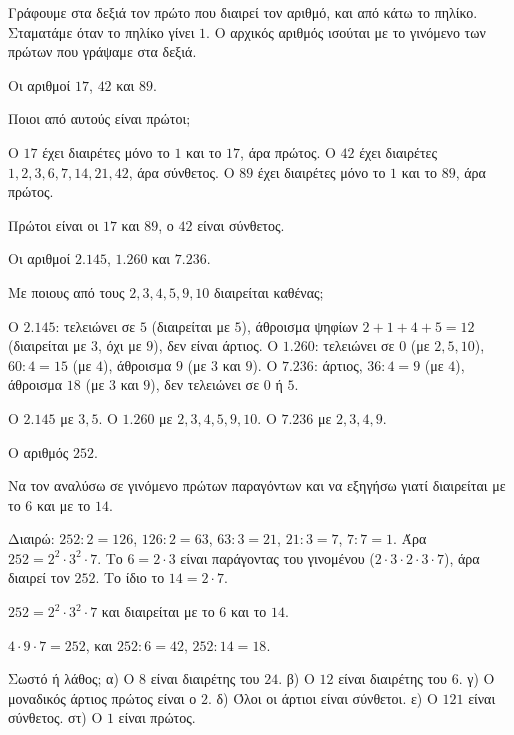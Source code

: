 Γράφουμε στα δεξιά τον πρώτο που διαιρεί τον αριθμό, και από κάτω το πηλίκο. Σταματάμε όταν το πηλίκο γίνει $1$. Ο αρχικός αριθμός ισούται με το γινόμενο των πρώτων που γράψαμε στα δεξιά.


\tixero Οι αριθμοί $17$, $42$ και $89$.\par
\tithelo Ποιοι από αυτούς είναι πρώτοι;\par
\possindeo Ο $17$ έχει διαιρέτες μόνο το $1$ και το $17$, άρα πρώτος. Ο $42$ έχει διαιρέτες $1,2,3,6,7,14,21,42$, άρα σύνθετος. Ο $89$ έχει διαιρέτες μόνο το $1$ και το $89$, άρα πρώτος.\par
\apantisi Πρώτοι είναι οι $17$ και $89$, ο $42$ είναι σύνθετος.

\tixero Οι αριθμοί $2.145$, $1.260$ και $7.236$.\par
\tithelo Με ποιους από τους $2,3,4,5,9,10$ διαιρείται καθένας;\par
\possindeo Ο $2.145$: τελειώνει σε $5$ (διαιρείται με $5$), άθροισμα ψηφίων $2+1+4+5=12$ (διαιρείται με $3$, όχι με $9$), δεν είναι άρτιος. Ο $1.260$: τελειώνει σε $0$ (με $2,5,10$), $60:4=15$ (με $4$), άθροισμα $9$ (με $3$ και $9$). Ο $7.236$: άρτιος, $36:4=9$ (με $4$), άθροισμα $18$ (με $3$ και $9$), δεν τελειώνει σε $0$ ή $5$.\par
\apantisi Ο $2.145$ με $3,5$. Ο $1.260$ με $2,3,4,5,9,10$. Ο $7.236$ με $2,3,4,9$.

\tixero Ο αριθμός $252$.\par
\tithelo Να τον αναλύσω σε γινόμενο πρώτων παραγόντων και να εξηγήσω γιατί διαιρείται με το $6$ και με το $14$.\par
\possindeo Διαιρώ: $252:2=126$, $126:2=63$, $63:3=21$, $21:3=7$, $7:7=1$. Άρα $252=2^2\cdot 3^2\cdot 7$. Το $6=2\cdot 3$ είναι παράγοντας του γινομένου ($2\cdot 3\cdot 2\cdot 3\cdot 7$), άρα διαιρεί τον $252$. Το ίδιο το $14=2\cdot 7$.\par
\apantisi $252=2^2\cdot 3^2\cdot 7$ και διαιρείται με το $6$ και το $14$.\par
\elegxos $4\cdot 9\cdot 7=252$, και $252:6=42$, $252:14=18$.



\ex Σωστό ή λάθος; α) Ο $8$ είναι διαιρέτης του $24$. \quad β) Ο $12$ είναι διαιρέτης του $6$. \quad γ) Ο μοναδικός άρτιος πρώτος είναι ο $2$. \quad δ) Όλοι οι άρτιοι είναι σύνθετοι. \quad ε) Ο $121$ είναι σύνθετος. \quad στ) Ο $1$ είναι πρώτος.

